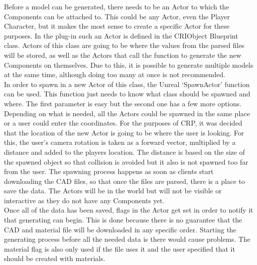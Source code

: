 Before a model can be generated, there needs to be an Actor to which the Components can be attached to. This could be any Actor, even the Player Character, but it makes the most sense to create a specific Actor for these purposes. In the plug-in such an Actor is defined in the CRIObject Blueprint class. Actors of this class are going to be where the values from the parsed files will be stored, as well as the Actors that call the function to generate the new Components on themselves. Due to this, it is possible to generate multiple models at the same time, although doing too many at once is not recommended.\\
In order to spawn in a new Actor of this class, the Unreal `SpawnActor' function can be used. This function just needs to know what class should be spawned and where. The first parameter is easy but the second one has a few more options. Depending on what is needed, all the Actors could be spawned in the same place or a user could enter the coordinates. For the purposes of \acs{CRP}, it was decided that the location of the new Actor is going to be where the user is looking. For this, the user's camera rotation is taken as a forward vector, multiplied by a distance and added to the players location. The distance is based on the size of the spawned object so that collision is avoided but it also is not spawned too far from the user. The spawning process happens as soon as clients start downloading the \acs{CAD} files, so that once the files are parsed, there is a place to save the data. The Actors will be in the world but will not be visible or interactive as they do not have any Components yet.\\
Once all of the data has been saved, flags in the Actor get set in order to notify it that generating can begin. This is done because there is no guarantee that the \acs{CAD} and material file will be downloaded in any specific order. Starting the generating process before all the needed data is there would cause problems. The material flag is also only used if the file uses it and the user specified that it should be created with materials.\\
